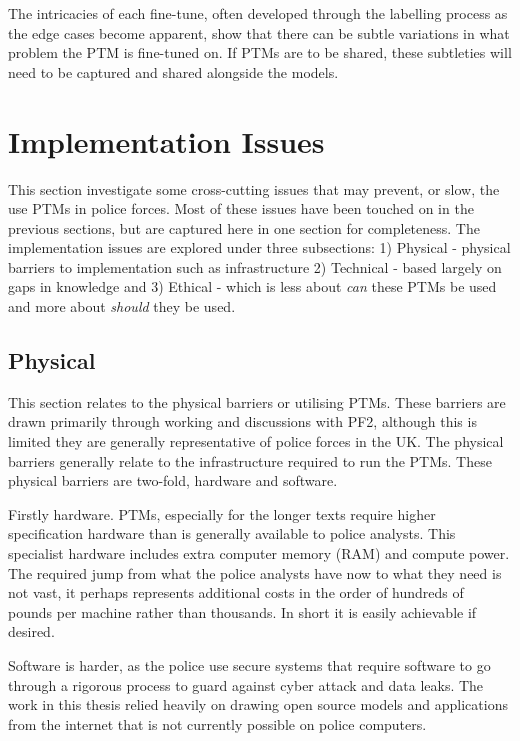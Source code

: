 The intricacies of each fine-tune, often developed through the labelling process as the edge cases become apparent, show that there can be subtle variations in what problem the PTM is fine-tuned on. If PTMs are to be shared, these subtleties will need to be captured and shared alongside the models.

\section{Implementation Issues} This section investigate some cross-cutting issues that may prevent, or slow, the use PTMs in police forces. Most of these issues have been touched on in the previous sections, but are captured here in one section for completeness. The implementation issues are explored under three subsections: 1) Physical - physical barriers to implementation such as infrastructure 2) Technical - based largely on gaps in knowledge and 3) Ethical - which is less about \emph{can} these PTMs be used and more about \emph{should} they be used.

\subsection{Physical} This section relates to the physical barriers or utilising PTMs. These barriers are drawn primarily through working and discussions with PF2, although this is limited they are generally representative of police forces in the UK. The physical barriers generally relate to the infrastructure required to run the PTMs. These physical barriers are two-fold, hardware and software. 

Firstly hardware. PTMs, especially for the longer texts require higher specification hardware than is generally available to police analysts. This specialist hardware includes extra computer memory (RAM) and compute power. The required jump from what the police analysts have now to what they need is not vast, it perhaps represents additional costs in the order of hundreds of pounds per machine rather than thousands. In short it is easily achievable if desired.  

Software is harder, as the police use secure systems that require software to go through a rigorous process to guard against cyber attack and data leaks. The work in this thesis relied heavily on drawing open source models and applications from the internet that is not currently possible on police computers. 

